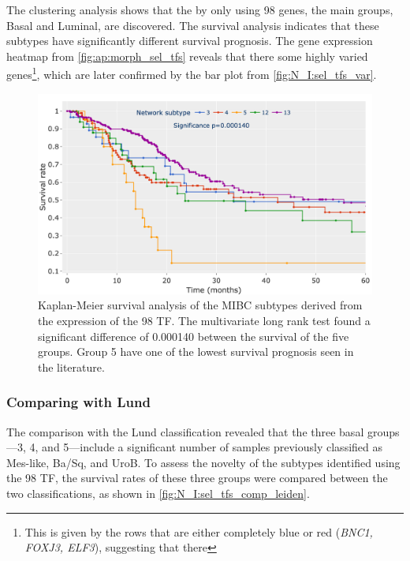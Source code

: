 The clustering analysis shows that the by only using 98 genes, the main groups, Basal and Luminal, are discovered. The survival analysis indicates that these subtypes have significantly different survival prognosis. The gene expression heatmap from \cref{fig:ap:morph_sel_tfs} reveals that there some highly varied genes\footnote{This is given by the rows that are either completely blue or red (\textit{BNC1, FOXJ3, ELF3}), suggesting that there }, which are later confirmed by the bar plot from \cref{fig:N_I:sel_tfs_var}. 


\begin{figure}[!t]
    \centering
    \includegraphics[width=1.0\textwidth,keepaspectratio]{Sections/Network_I/Resources/selective_pruning/sel_tfs/survival_sel_tfs_cs.png}
    \caption[Survival analysis of the five MIBC groups found using the 98 TF]{Kaplan-Meier survival analysis of the MIBC subtypes derived from the expression of the 98 TF. The multivariate long rank test found a significant difference of 0.000140 between the survival of the five groups. Group 5 have one of the lowest survival prognosis seen in the literature. }
    \label{fig:N_I:sel_tfs_survival}
\end{figure} 


\subsubsection*{Comparing with Lund} \label{s:N_I:sel_tfs_comp_survival}

The comparison with the Lund classification \citep{Marzouka2018-ge} revealed that the three basal groups—3, 4, and 5—include a significant number of samples previously classified as Mes-like, Ba/Sq, and UroB. To assess the novelty of the subtypes identified using the 98 TF, the survival rates of these three groups were compared between the two classifications, as shown in \cref{fig:N_I:sel_tfs_comp_leiden}.

